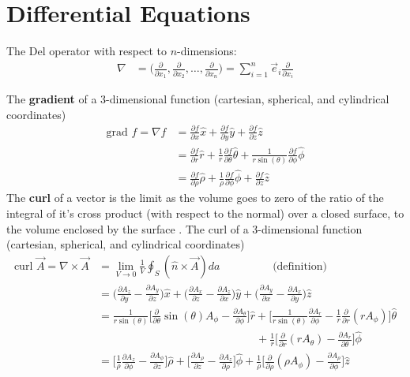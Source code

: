 \chapter{Differential Equations}
\thispagestyle{fancy}
\begin{defn}{1}
	The Del operator with respect to $n$-dimensions:
\begin{align}
\nabla &= \bigg( \frac{\partial}{\partial x_1}, \frac{\partial}{\partial x_2}, \dots, \frac{\partial}{\partial x_n} \bigg) = \sum_{i=1}^{n}\vec{e}_i\frac{\partial}{\partial x_i}
\end{align}
\end{defn}
The \textbf{gradient} of a 3-dimensional function (cartesian, spherical, and cylindrical coordinates)
\begin{align}
\textrm{grad } f = \nabla f &= \frac{\partial f}{\partial x}\hat{x}+\frac{\partial f}{\partial y}\hat{y}+\frac{\partial f}{\partial z}\hat{z} \\
&=\frac{\partial f}{\partial r}\hat{r}+\frac{1}{r}\frac{\partial f}{\partial \theta}\hat{\theta}+\frac{1}{r\sin(\theta)}\frac{\partial f}{\partial \phi}\hat{\phi} \\
&=\frac{\partial f}{\partial \rho}\hat{\rho}+\frac{1}{\rho}\frac{\partial f}{\partial \phi}\hat{\phi}+\frac{\partial f}{\partial z}\hat{z}
\end{align}
The \textbf{curl} of a vector is the limit as the volume goes to zero of the ratio of the integral of it's cross product (with respect to the normal) over a closed surface, to the volume enclosed by the surface \cite{bib:ReitzEMTheory}. The curl of a 3-dimensional function (cartesian, spherical, and cylindrical coordinates)
\begin{align}
\textrm{curl } \vec{A} = \nabla \times \vec{A} &= \lim\limits_{V\rightarrow 0}\frac{1}{V}\oint_S(\hat{n}\times \vec{A})da\hspace{2cm}\textrm{(definition)} \\
&= \bigg( \frac{\partial A_z}{\partial y} -\frac{\partial A_y}{\partial z}\bigg)\hat{x}+\bigg( \frac{\partial A_x}{\partial z} -\frac{\partial A_z}{\partial x}\bigg)\hat{y}+\bigg( \frac{\partial A_y}{\partial x} -\frac{\partial A_x}{\partial y}\bigg)\hat{z} \\ &= \frac{1}{r\sin(\theta)}\bigg[\frac{\partial}{\partial \theta}\sin(\theta)A_\phi-\frac{\partial A_\theta}{\partial \phi}\bigg]\hat{r}+\bigg[\frac{1}{r\sin(\theta)}\frac{\partial A_r}{\partial \phi}-\frac{1}{r}\frac{\partial}{\partial r}(rA_\phi) \bigg]\hat{\theta} \nonumber \\
& \hspace{6cm}+ \frac{1}{r}\bigg[\frac{\partial}{\partial r}(rA_\theta)-\frac{\partial A_r}{\partial \theta} \bigg]\hat{\phi} \\
&= \bigg[\frac{1}{\rho}\frac{\partial A_z}{\partial \phi}-\frac{\partial A_\phi}{\partial z} \bigg] \hat{\rho} + \bigg[\frac{\partial A_\rho}{\partial z}-\frac{\partial A_z}{\partial \rho}  \bigg]\hat{\phi} + \frac{1}{\rho}\bigg[\frac{\partial}{\partial \rho}(\rho A_\phi)-\frac{\partial A_\rho}{\partial \phi} \bigg]\hat{z} 
\end{align}
